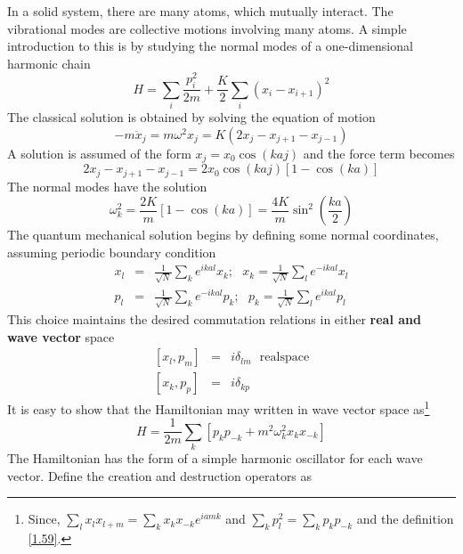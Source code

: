 In a solid system, there are many atoms, which mutually interact.
The vibrational modes are collective motions involving many atoms.
A simple introduction to this is by studying the normal modes of a one-dimensional harmonic chain
\begin{equation}
    H = \sum_i \frac{p_i^2}{2m } + \frac{K}{2} \sum_i \left( x_i - x_{i+1} \right)^2    \label{1.57}
\end{equation}
The classical solution is obtained by solving the equation of motion
\begin{equation}
    - m \ddot{x}_j = m \omega^2 x_j = K(2x_j -x_{j+1} - x_{j-1} )   \label{1.58}
\end{equation}
A solution is assumed of the form $x_j = x_0 \cos(k a j )$ and the force term becomes
\begin{equation}
    2 x_j - x_{j+1} - x_{j-1} = 2x_0 \cos(k a j) \left[ 1 - \cos(k a) \right]
\end{equation}
The normal modes have the solution
\begin{equation}
    \omega_k^2 = \frac{2K}{m} \left[ 1- \cos(k a) \right] = \frac{4K}{m} \sin^2( \frac{k a}{2} )    \label{1.59}
\end{equation}
The quantum mechanical solution begins by defining some normal coordinates, assuming periodic boundary condition
\begin{eqnarray}
    x_l &=& \frac{1}{\sqrt{N}} \sum_k e^{ikal} x_k; ~ ~ ~ x_k = \frac{1}{\sqrt{N}} \sum_l e^{-ikal} x_l \\
    p_l &=& \frac{1}{\sqrt{N}} \sum_k e^{-ikal} p_k; ~ ~ ~ p_k = \frac{1}{\sqrt{N}} \sum_l e^{ikal} p_l \label{1.60}
\end{eqnarray}
This choice maintains the desired commutation relations in either \textbf{real and wave vector} space
\begin{eqnarray}
    \left[x_l, p_m\right] &=& i \delta_{lm}~ ~ ~ \mathrm{real space} \label{1.61}   \\
    \left[x_k, p_p\right] &=& i \delta_{kp} \label{1.63}
\end{eqnarray}
It is easy to show that the Hamiltonian may written in wave vector space as\footnote{
    Since, $\sum_l x_l x_{l+m} = \sum_k x_k x_{-k} e^{iamk}$ and $\sum_k p_l^2 = \sum_k p_k p_{-k}$ and the definition \eqref{1.59}.
}
\begin{equation}
    H = \frac{1}{2m}  \sum_k \left[ p_k p_{-k} + m^2 \omega_k^2 x_k x_{-k} \right]  \label{1.64}
\end{equation}
The Hamiltonian has the form of a simple harmonic oscillator for each wave vector. Define the creation and destruction operators as
